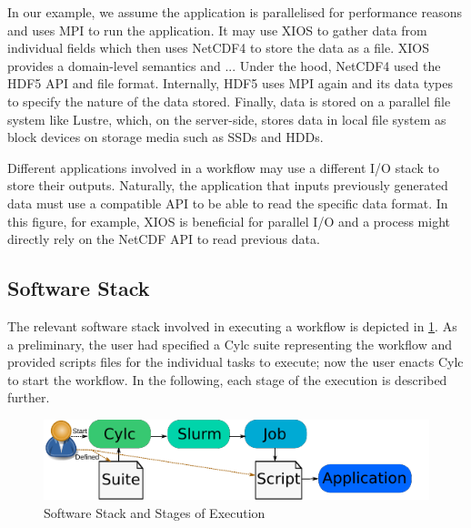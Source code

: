 \documentclass[a4paper]{article}
\newcommand{\jk}[1]{\todo[inline]{JK: #1}}
\begin{document}
\begin{minipage}{0.7\textwidth}
In our example, we assume the application is parallelised for performance reasons and uses MPI to run the application.
It may use XIOS to gather data from individual fields which then uses NetCDF4 to store the data as a file.
XIOS provides a domain-level semantics and ...\jk{TODO}
Under the hood, NetCDF4 used the HDF5 API and file format.
Internally, HDF5 uses MPI again and its data types to specify the nature of the data stored.
Finally, data is stored on a parallel file system like Lustre, which, on the server-side, stores data in local file system as block devices on storage media such as SSDs and HDDs.

Different applications involved in a workflow may use a different I/O stack to store their outputs.
Naturally, the application that inputs previously generated data must use a compatible API to be able to read the specific data format.
In this figure, for example, XIOS is beneficial for parallel I/O and a process might directly rely on the NetCDF API to read previous data.
\end{minipage}



\subsection{Software Stack}

The relevant software stack involved in executing a workflow is depicted in \ref{fig:stages}.
As a preliminary, the user had specified a Cylc suite representing the workflow and provided scripts files for the individual tasks to execute; now the user enacts Cylc to start the workflow.
In the following, each stage of the execution is described further.

\begin{figure}[H]
  \centering
  \includegraphics[scale=1.4]{stages}
  \caption{Software Stack and Stages of Execution}
  \label{fig:stages}
\end{figure}
\end{document}
